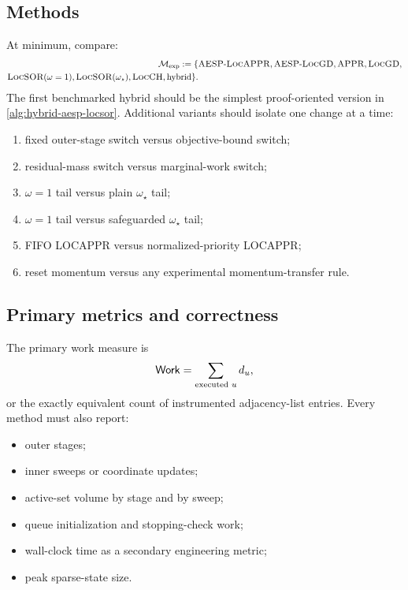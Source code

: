 \subsection{Methods}

At minimum, compare:
\begin{equation}
\begin{aligned}
    \mathcal M_{\rm exp}:=\{&\textsc{AESP}\text{-}\textsc{LocAPPR},
      \textsc{AESP}\text{-}\textsc{LocGD},
      \textsc{APPR},
      \textsc{LocGD},\\
      \textsc{LocSOR}(\omega=1),
      \textsc{LocSOR}(\omega_\star),
      \textsc{LocCH},
      \text{hybrid}\}.
\end{aligned}
    \label{eq:experimental-methods}
\end{equation}
The first benchmarked hybrid should be the simplest proof-oriented version in
\cref{alg:hybrid-aesp-locsor}.  Additional variants should isolate one change
at a time:
\begin{enumerate}[leftmargin=2em]
\item fixed outer-stage switch versus objective-bound switch;
\item residual-mass switch versus marginal-work switch;
\item \(\omega=1\) tail versus plain \(\omega_\star\) tail;
\item \(\omega=1\) tail versus safeguarded \(\omega_\star\) tail;
\item FIFO LOCAPPR versus normalized-priority LOCAPPR;
\item reset momentum versus any experimental momentum-transfer rule.
\end{enumerate}

\subsection{Primary metrics and correctness}

The primary work measure is
\begin{equation}
    \mathsf{Work}=\sum_{\text{executed }u}d_u,
    \label{eq:experiment-work}
\end{equation}
or the exactly equivalent count of instrumented adjacency-list entries.  Every
method must also report:
\begin{itemize}[leftmargin=2em]
\item outer stages;
\item inner sweeps or coordinate updates;
\item active-set volume by stage and by sweep;
\item queue initialization and stopping-check work;
\item wall-clock time as a secondary engineering metric;
\item peak sparse-state size.
\end{itemize}

